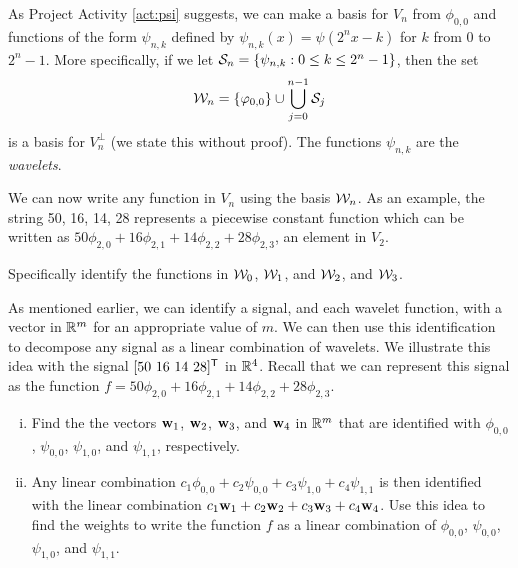 As Project Activity \ref{act:psi} suggests, we can make a basis for $V_n$ from $\phi_{0,0}$ and functions of the form $\psi_{n,k}$ defined by $\psi_{n,k}(x) = \psi\left(2^nx-k\right)$ for $k$ from 0 to $2^n-1$.  More specifically, if we let $\mathcal{S}_n = \{\psi_{n,k} : 0 \leq k \leq 2^n-1\}$, then the set 
\[\mathcal{W}_n = \{\varphi_{0,0}\} \cup \bigcup_{j=0}^{n-1} \mathcal{S}_j\]
is a basis for $V_n^{\perp}$ (we state this without proof). The functions $\psi_{n,k}$ are the \emph{wavelets}. 

\begin{pactivity} \label{act:wavelets_differencing} We can now write any function in $V_n$ using the basis $\mathcal{W}_n$. As an example, the string 50, 16, 14, 28 represents a piecewise constant function which can be written as $50 \phi_{2,0} + 16 \phi_{2,1} + 14 \phi_{2,2} + 28 \phi_{2,3}$, an element in $V_2$. 
	\ba
	\item Specifically identify the functions in $\mathcal{W}_0$, $\mathcal{W}_1$, and $\mathcal{W}_2$, and $\mathcal{W}_3$. 


	\item As mentioned earlier, we can identify a signal, and each wavelet function, with a vector in $\mathbb{R}^m$ for an appropriate value of $m$. We can then use this identification to decompose any signal as a linear combination of wavelets. We illustrate this idea with the signal $[50 \ 16 \ 14 \ 28]^{\mathsf{T}}$ in $\mathbb{R}^4$. Recall that we can represent this signal as the function $f = 50 \phi_{2,0} + 16 \phi_{2,1} + 14 \phi_{2,2} + 28 \phi_{2,3}$.
	\begin{enumerate}[i.]
	\item Find the the vectors $\mathbf{w}_1$, $\mathbf{w}_2$, $\mathbf{w}_3$, and $\mathbf{w}_4$ in $\mathbb{R}^m$ that are identified with $\phi_{0,0}$, $\psi_{0,0}$, $\psi_{1,0}$, and $\psi_{1,1}$, respectively.
	

	\item Any linear combination $c_1\phi_{0,0} + c_2 \psi_{0,0} + c_3 \psi_{1,0} + c_4\psi_{1,1}$ is then identified with the linear combination $c_1 \mathbf{w}_1 + c_2 \mathbf{w}_2 + c_3 \mathbf{w}_3 + c_4 \mathbf{w}_4$. Use this idea to find the weights to write the function $f$ as a linear combination of $\phi_{0,0}$, $\psi_{0,0}$, $\psi_{1,0}$, and $\psi_{1,1}$.
	

	
	\end{enumerate}

\ea

\end{pactivity}

